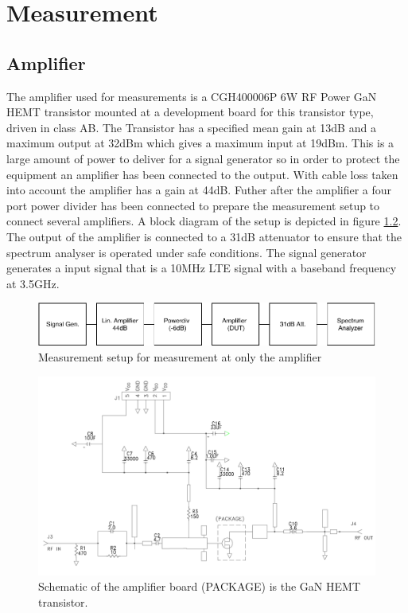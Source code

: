 \chapter{Measurement}\label{ch:measurement}


\section{Amplifier}

The amplifier used for measurements is a CGH400006P 6W RF Power GaN HEMT transistor mounted at a development board for this transistor type, driven in class AB. The Transistor has a specified mean gain at 13dB and a maximum output at 32dBm which gives a maximum input at 19dBm. This is a large amount of power to deliver for a signal generator so in order to protect the equipment an amplifier has been connected to the output. With cable loss taken into account the amplifier has a gain at 44dB. Futher after the amplifier a four port power divider has been connected to prepare the measurement setup to connect several amplifiers. A block diagram of the setup is depicted in figure \ref{fig:meas_amp}. The output of the amplifier is connected to a 31dB attenuator to ensure that the spectrum analyser is operated under safe conditions. The signal generator generates a input signal that is a 10MHz LTE signal with a baseband frequency at 3.5GHz.   


\begin{figure}[H]
\centering 
\includegraphics[scale = 0.9]{figures/measurement/cree/meas1/meas_set_1.pdf}
\caption{Measurement setup for measurement at only the amplifier }
\label{fig:meas_amp}
\end{figure}


\begin{figure}[H]
\centering 
\includegraphics[scale = 0.4]{figures/measurement/cree/cree_schematic.png}
\caption{Schematic of the amplifier board (PACKAGE) is the GaN HEMT transistor. \citep{cree2019}}
\label{fig:meas_amp}
\end{figure}


